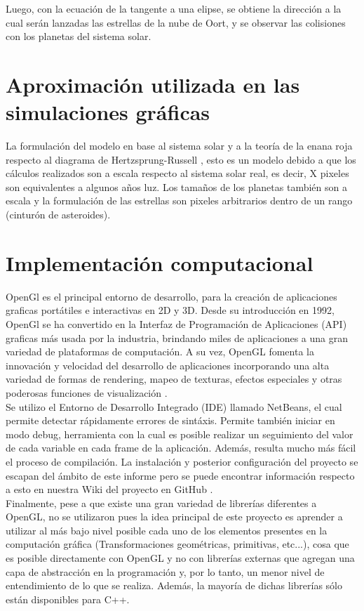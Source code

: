 \documentclass[journal]{IEEEtran}
\begin{document}
Luego, con la ecuación de la tangente a una elipse, se obtiene la dirección a la cual serán lanzadas las estrellas de la nube de Oort, y se observar las colisiones con los planetas del sistema solar.

\section{Aproximación utilizada en las simulaciones gráficas}

La formulación del modelo en base al sistema solar y a la teoría de la enana roja respecto al diagrama de Hertzsprung-Russell \cite{russel}, esto es un modelo debido a que los cálculos realizados son a escala respecto al sistema solar real, es decir, X pixeles son equivalentes a algunos años luz. Los tamaños de los planetas también son a escala y la formulación de las estrellas son pixeles arbitrarios dentro de un rango (cinturón de asteroides).

\section{Implementación computacional}

OpenGl es el principal entorno de desarrollo, para la creación de aplicaciones graficas portátiles e interactivas en  2D y 3D. Desde su introducción en 1992, OpenGl se ha convertido en la Interfaz de Programación de Aplicaciones (API) graficas más usada por la industria, brindando miles de aplicaciones a una gran variedad de plataformas de computación. A su vez, OpenGL fomenta la innovación y velocidad del desarrollo de aplicaciones incorporando una alta variedad de formas de rendering, mapeo de texturas, efectos especiales y otras poderosas funciones de visualización \cite{opengl}.\\

Se utilizo el Entorno de Desarrollo Integrado (IDE) llamado NetBeans, el cual permite detectar rápidamente errores de sintáxis. Permite también iniciar en modo debug, herramienta con la cual es posible realizar un seguimiento del valor de cada variable en cada frame de la aplicación. Además, resulta mucho más fácil el proceso de compilación. La instalación y posterior configuración del proyecto se escapan del ámbito de este informe pero se puede encontrar información respecto a esto en nuestra Wiki del proyecto en GitHub \cite{wiki}.\\

Finalmente, pese a que existe una gran variedad de librerías diferentes a OpenGL, no se utilizaron pues la idea principal de este proyecto es aprender a utilizar al más bajo nivel posible cada uno de los elementos presentes en la computación gráfica (Transformaciones geométricas, primitivas, etc...), cosa que es posible directamente con OpenGL y no con librerías externas que agregan una capa de abstracción en la programación y, por lo tanto, un menor nivel de entendimiento de lo que se realiza. Además, la mayoría de dichas librerías sólo están disponibles para C++.
\end{document}

